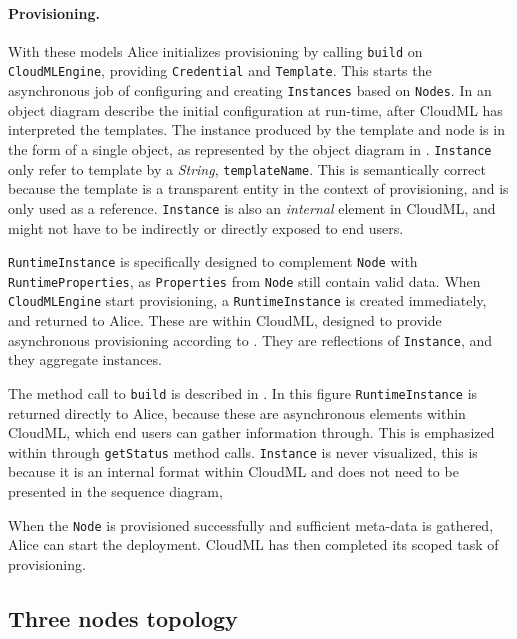 \paragraph{Provisioning.}



With these models Alice initializes provisioning by calling 
\texttt{build} on \texttt{CloudMLEngine}, providing \texttt{Credential} and \texttt{Template}.
This starts the asynchronous job of configuring and creating 
\texttt{Instances} based on \texttt{Nodes}.
In  an object diagram describe the initial configuration at run-time,
after CloudML has interpreted the templates.
The instance produced by the template and node is in the form of a single object,
as represented by the object diagram in .
\texttt{Instance} only refer to template by a \emph{String}, \texttt{templateName}.
This is semantically correct because the template is a transparent entity
in the context of provisioning, and is only used as a reference.
\texttt{Instance} is also an \emph{internal} element in CloudML, and might not 
have to be indirectly or directly exposed to end users.

\texttt{RuntimeInstance} is specifically designed to complement \texttt{Node} with \texttt{RuntimeProperties},
as \texttt{Properties} from \texttt{Node} still contain valid data.
When \texttt{CloudMLEngine} start provisioning, a \texttt{RuntimeInstance} is created immediately,
and returned to Alice.
These are  within CloudML, designed to provide asynchronous provisioning
according to .
They are reflections of \texttt{Instance}, and they aggregate instances.

The method call to \texttt{build} is described in .
In this figure \texttt{RuntimeInstance} is returned directly to Alice,
because these are asynchronous elements within CloudML, which end users can gather 
information through.
This is emphasized within  through \texttt{getStatus} method calls.
\texttt{Instance} is never visualized, this is because it is an internal format
within CloudML and does not need to be presented in the sequence diagram,

When the \texttt{Node} is provisioned successfully and sufficient meta-data is gathered,
Alice can start the deployment.
CloudML has then completed its scoped task of provisioning.

\subsection{Three nodes topology}

